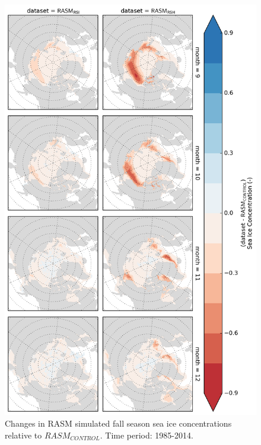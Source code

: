 \documentclass[draft]{agujournal}
\begin{document}
\clearpage
\begin{figure}
    \centering
    \includegraphics[width=12cm,keepaspectratio]{fall_seaice_concentration_changes}
    \caption{Changes in RASM simulated fall season sea ice concentrations relative to $RASM_{CONTROL}$.
    Time period: 1985-2014.}
    \label{fig:sea_ice_conc_sup}
\end{figure}
\end{document}
